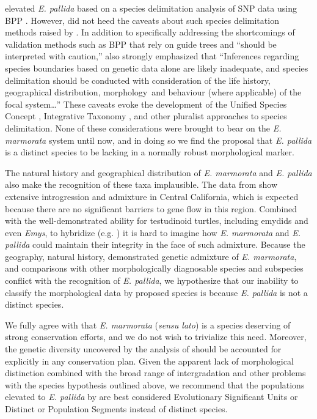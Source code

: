 \documentclass[12pt,letterpaper]{article}
\begin{document}
\citet{Spinks2014} elevated \textit{E. pallida} based on a species delimitation analysis of SNP data using BPP \citep{Yang2010b}. However, \citet{Spinks2014} did not heed the caveats about such species delimitation methods raised by \citet{Carstens2013}. In addition to specifically addressing the shortcomings of validation methods such as BPP that rely on guide trees and ``should be interpreted with caution,'' \citet{Carstens2013} also strongly emphasized that ``Inferences regarding species boundaries based on genetic data alone are likely inadequate, and species delimitation should be conducted with consideration of the life history, geographical distribution, morphology and behaviour (where applicable) of the focal system\dots'' These caveats evoke the development of the Unified Species Concept \citep{Dayrat2005a,DeQueiroz2007b}, Integrative Taxonomy \citep{Padial2010}, and other pluralist approaches to species delimitation. None of these considerations were brought to bear on the \textit{E. marmorata} system until now, and in doing so we find the proposal that \textit{E. pallida} is a distinct species to be lacking in a normally robust morphological marker.

The natural history and geographical distribution of \textit{E. marmorata} and \textit{E. pallida} also make the recognition of these taxa implausible. The data from \citet{Spinks2014} show extensive introgression and admixture in Central California, which is expected because there are no significant barriers to gene flow in this region. Combined with the well-demonstrated ability for testudinoid turtles, including emydids and even \textit{Emys}, to hybridize (e.g. \citealt{Buskirk2005,Spinks2009,Parham2013}) it is hard to imagine how \textit{E. marmorata} and \textit{E. pallida} could maintain their integrity in the face of such admixture. Because the geography, natural history, demonstrated genetic admixture of \textit{E. marmorata}, and comparisons with other morphologically diagnosable species and subspecies conflict with the recognition of \textit{E. pallida}, we hypothesize that our inability to classify the morphological data by proposed species is because \textit{E. pallida} is not a distinct species. 

We fully agree with \citet{Spinks2014} that \textit{E. marmorata} (\textit{sensu lato}) is a species deserving of strong conservation efforts, and we do not wish to trivialize this need. Moreover, the genetic diversity uncovered by the analysis of \citet{Spinks2014} should be accounted for explicitly in any conservation plan. Given the apparent lack of morphological distinction combined with the broad range of intergradation and other problems with the species hypothesis outlined above, we recommend that the populations elevated to \textit{E. pallida} by \citet{Spinks2014} are best considered Evolutionary Significant Units or Distinct or Population Segments instead of distinct species.
\end{document}
